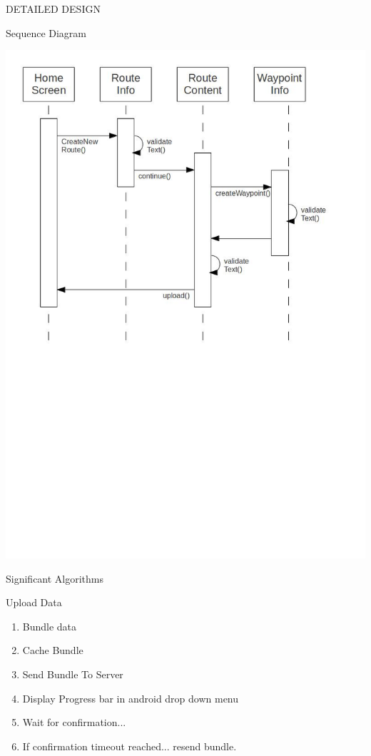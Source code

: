 \documentclass{article}
\begin{document}
\clearpage
\begin{section}{DETAILED DESIGN}
	\begin{subsection}{Sequence Diagram}
		\begin{center}
			\includegraphics[width=0.9\columnwidth]{../SequenceDiagram/DetailedDesign5-1.jpg}
		\end{center}
	\end{subsection}
	
	\begin{subsection}{Significant Algorithms}
		\begin{subsubsection}{Upload Data}
		    \begin{enumerate}
		        \item{Bundle data}
		        \item{Cache Bundle}
		        \item{Send Bundle To Server}
		        \item{Display Progress bar in android drop down menu}
		        \item{Wait for confirmation...}
		        \item{If confirmation timeout reached... resend bundle.}
		    \end{enumerate}
		\end{subsubsection}
		

\end{subsection}
\end{section}
\end{document}
